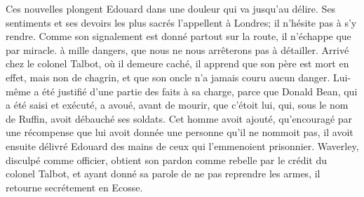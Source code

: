 Ces nouvelles plongent Edouard dans une douleur qui va jusqu'au délire. Ses sentiments et ses devoirs les plus sacrés l'appellent à Londres; il n'hésite pas à s'y rendre. Comme son signalement est donné partout sur la route, il n'échappe que par miracle.\setcounter{page}{369} à mille dangers, que nous ne nous arrêterons pas à détailler. Arrivé chez le colonel Talbot, où il demeure caché, il apprend que son père est mort en effet, mais non de chagrin, et que son oncle n'a jamais couru aucun danger. Lui-même a été justifié d'une partie des faits à sa charge, parce que Donald Bean, qui a été saisi et exécuté, a avoué, avant de mourir, que c'étoit lui, qui, sous le nom de Ruffin, avoit débauché ses soldats. Cet homme avoit ajouté, qu'encouragé par une récompense que lui avoit donnée une personne qu'il ne nommoit pas, il avoit ensuite délivré Edouard des mains de ceux qui l'emmenoient prisonnier. Waverley, disculpé comme officier, obtient son pardon comme rebelle par le crédit du colonel Talbot, et ayant donné sa parole de ne pas reprendre les armes, il retourne secrétement en Ecosse.
